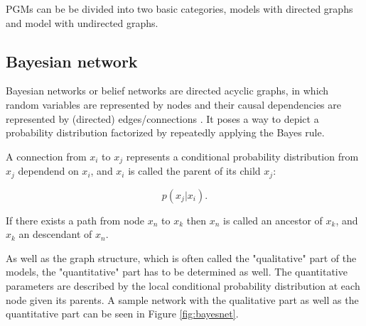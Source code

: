 PGMs can be be divided into two basic categories, models with directed graphs and model with undirected graphs.


\subsection{Bayesian network}

Bayesian networks or belief networks are directed acyclic graphs, in which random variables are represented by nodes and their causal dependencies are represented by (directed) edges/connections \cite{Faltin2007} \cite{Goodfellow-et-al-2016-Book}. 
It poses a way to depict a probability distribution factorized by repeatedly applying the Bayes rule.

A connection from $x_i$ to $x_j$ represents a conditional probability distribution from $x_j$ dependend on $x_i$, and $x_i$ is called the parent of its child $x_j$:

\[
p(x_j | x_i) .
\]


If there exists a path from node $x_n$ to $x_k$ then $x_n$ is called an ancestor of $x_k$, and $x_k$ an descendant of $x_n$. 

As well as the graph structure, which is often called the "qualitative" part of the models, the "quantitative" part has to be determined as well.
The quantitative parameters are described by the local conditional probability distribution at each node given its parents.
A sample network with the qualitative part as well as the quantitative part can be seen in Figure \ref{fig:bayesnet}. 

